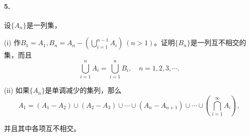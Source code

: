 \documentclass[12pt, a4paper, oneside]{ctexart}
\begin{document}
\paragraph{5.}设$\{A_n\}$是一列集，

(i) 作$B_1=A_1,B_n=A_n-\left(\bigcup_{i=1}^{n-1}A_i\right)\ (n > 1)$。证明$\{B_n\}$是一列互不相交的集，而且
\begin{equation*}
    \bigcup_{i=1}^nA_i=\bigcup_{i=1}^nB_i,\quad n=1,2,3,\cdots.
\end{equation*}

(ii) 如果$\{A_n\}$是单调减少的集列，那么
\begin{equation*}
    A_1=(A_1-A_2)\cup(A_2-A_3)\cup\cdots\cup(A_n-A_{n+1})\cup\cdots\cup(\bigcap_{i=1}^{\infty}A_i),
\end{equation*}

并且其中各项互不相交。
\end{document}
